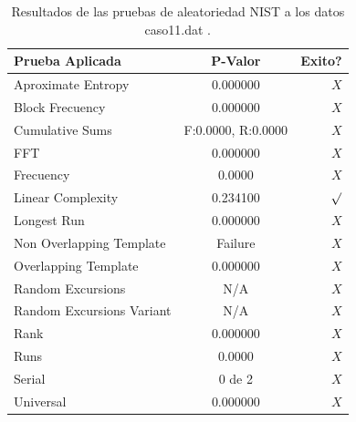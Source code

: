 \documentclass[10pt]{IEEEtran}
\begin{document}
\begin{table}[H]
\caption{Resultados de las pruebas de aleatoriedad NIST a los datos caso11.dat .}
\label{caso7}
\begin{center}
\begin{small}
\begin{tabular}{|l|c|r|}
\hline

Prueba Aplicada &  P-Valor & Exito? \\
\hline

Aproximate Entropy    &     0.000000 & $X$ \\

Block Frecuency  & 0.000000  &  $X$  \\

Cumulative Sums    &   F:0.0000, R:0.0000   & $X$ \\

FFT    &   0.000000 &   $X$      \\

Frecuency     & 0.0000 &  $X$   \\

Linear Complexity      & 0.234100 & $\surd$ \\

Longest Run      &   0.000000 &   $X$     \\

Non Overlapping Template      & Failure   &    $X$          \\

Overlapping Template      &    0.000000   &       $X$        \\

Random Excursions      & N/A  &    $X$      \\

Random Excursions Variant & N/A &     $X$    \\

Rank &  0.000000  &      $X$     \\

Runs &     0.0000  &       $X$      \\

Serial &     0 de 2    &     $X$        \\

Universal &        0.000000  &      $X$             \\

\hline

\end{tabular}
\end{small}
\end{center}
\end{table}
\end{document}
